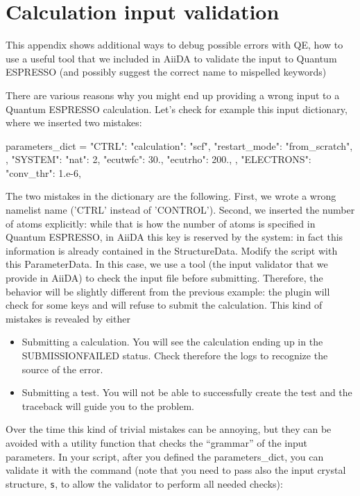 \section{Calculation input validation}
This appendix shows additional ways to debug possible errors with QE, how to use a useful tool that we included in AiiDA to validate the input to Quantum ESPRESSO (and possibly suggest the correct name to mispelled keywords)

There are various reasons why you might end up providing a wrong input to a Quantum ESPRESSO calculation.
Let's check for example this input dictionary, where we inserted two mistakes:
\begin{pythoncommand}
parameters_dict = {
    "CTRL": {
        "calculation": "scf",
        "restart_mode": "from_scratch",
    },
    "SYSTEM": {
        "nat": 2,
        "ecutwfc": 30.,
        "ecutrho": 200.,
    },
    "ELECTRONS": {
        "conv_thr": 1.e-6,
    }
}
\end{pythoncommand}

The two mistakes in the dictionary are the following.
First, we wrote a wrong namelist name ('CTRL' instead of 'CONTROL').
Second, we inserted the number of atoms explicitly: while that is how the number of atoms is specified in Quantum ESPRESSO, in AiiDA this key is reserved by the system: in fact this information is already contained in the StructureData. Modify the script with this ParameterData. 
In this case, we use a tool (the input validator that we provide in AiiDA) to check the input file before submitting. Therefore, the behavior will be slightly different from the previous example: the plugin will check for some keys and will refuse to submit the calculation.
This kind of mistakes is revealed by either
\begin{itemize}
\item Submitting a calculation. You will see the calculation ending up in the SUBMISSIONFAILED status. Check therefore the logs to recognize the source of the error.
\item Submitting a test. You will not be able to successfully create the test and the traceback will guide you to the problem.
\end{itemize}


Over the time this kind of trivial mistakes can be annoying, but they can be avoided with a utility function that checks the ``grammar'' of the input parameters.
In your script, after you defined the parameters\_dict, you can validate it with the command
(note that you need to pass also the input crystal structure, \texttt{s}, to
allow the validator to perform all needed checks):

